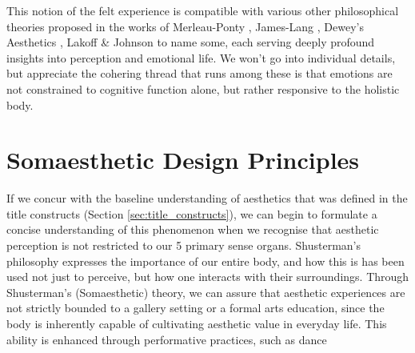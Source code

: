 This notion of the felt experience is compatible with various other philosophical theories proposed in the works of Merleau-Ponty \cite{merleau-ponty_phenomenology_2012}, James-Lang \cite{cannon_james-lange_1927}, Dewey's Aesthetics \cite{dewey_aesthetic_1950}, Lakoff \& Johnson \cite{lakoff_philosophy_1999} to name some, each serving deeply profound insights into perception and emotional life. We won't go into individual details, but appreciate the cohering thread that runs among these is that emotions are not constrained to cognitive function alone, but rather responsive to the holistic body.





\section{Somaesthetic Design Principles}

If we concur with the baseline understanding of aesthetics that was defined in the title constructs (Section \ref{sec:title_constructs}), we can begin to formulate a concise understanding of this phenomenon when we recognise that aesthetic perception is not restricted to our 5 primary sense organs. Shusterman's philosophy expresses the importance of our entire body, and how this is has been used not just to perceive, but how one interacts with their surroundings. Through Shusterman’s (Somaesthetic) theory, we can assure that aesthetic experiences are not strictly bounded to a gallery setting or a formal arts education, since the body is inherently capable of cultivating aesthetic value in everyday life. This ability is enhanced through performative practices, such as dance \cite{eric_c_mullis_performative_2006}

